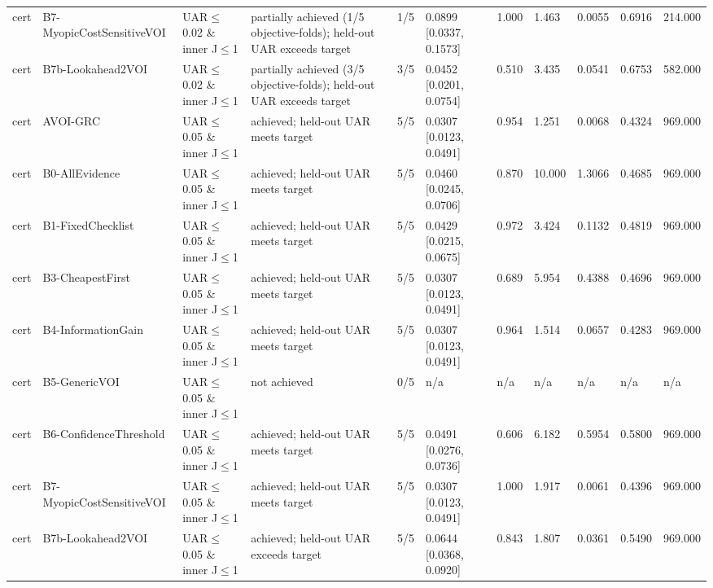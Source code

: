 \begin{table}[!ht]
{\begin{tabular}{lllllllllll}
cert & B7-MyopicCostSensitiveVOI & UAR$\le$0.02 \& inner J$\le$1 & partially achieved (1/5 objective-folds); held-out UAR exceeds target & 1/5 & 0.0899 [0.0337, 0.1573] & 1.000 & 1.463 & 0.0055 & 0.6916 & 214.000 \\
cert & B7b-Lookahead2VOI & UAR$\le$0.02 \& inner J$\le$1 & partially achieved (3/5 objective-folds); held-out UAR exceeds target & 3/5 & 0.0452 [0.0201, 0.0754] & 0.510 & 3.435 & 0.0541 & 0.6753 & 582.000 \\
cert & AVOI-GRC & UAR$\le$0.05 \& inner J$\le$1 & achieved; held-out UAR meets target & 5/5 & 0.0307 [0.0123, 0.0491] & 0.954 & 1.251 & 0.0068 & 0.4324 & 969.000 \\
cert & B0-AllEvidence & UAR$\le$0.05 \& inner J$\le$1 & achieved; held-out UAR meets target & 5/5 & 0.0460 [0.0245, 0.0706] & 0.870 & 10.000 & 1.3066 & 0.4685 & 969.000 \\
cert & B1-FixedChecklist & UAR$\le$0.05 \& inner J$\le$1 & achieved; held-out UAR meets target & 5/5 & 0.0429 [0.0215, 0.0675] & 0.972 & 3.424 & 0.1132 & 0.4819 & 969.000 \\
cert & B3-CheapestFirst & UAR$\le$0.05 \& inner J$\le$1 & achieved; held-out UAR meets target & 5/5 & 0.0307 [0.0123, 0.0491] & 0.689 & 5.954 & 0.4388 & 0.4696 & 969.000 \\
cert & B4-InformationGain & UAR$\le$0.05 \& inner J$\le$1 & achieved; held-out UAR meets target & 5/5 & 0.0307 [0.0123, 0.0491] & 0.964 & 1.514 & 0.0657 & 0.4283 & 969.000 \\
cert & B5-GenericVOI & UAR$\le$0.05 \& inner J$\le$1 & not achieved & 0/5 & n/a & n/a & n/a & n/a & n/a & n/a \\
cert & B6-ConfidenceThreshold & UAR$\le$0.05 \& inner J$\le$1 & achieved; held-out UAR meets target & 5/5 & 0.0491 [0.0276, 0.0736] & 0.606 & 6.182 & 0.5954 & 0.5800 & 969.000 \\
cert & B7-MyopicCostSensitiveVOI & UAR$\le$0.05 \& inner J$\le$1 & achieved; held-out UAR meets target & 5/5 & 0.0307 [0.0123, 0.0491] & 1.000 & 1.917 & 0.0061 & 0.4396 & 969.000 \\
cert & B7b-Lookahead2VOI & UAR$\le$0.05 \& inner J$\le$1 & achieved; held-out UAR exceeds target & 5/5 & 0.0644 [0.0368, 0.0920] & 0.843 & 1.807 & 0.0361 & 0.5490 & 969.000 \\
\bottomrule
\end{tabular}}
\end{table}
